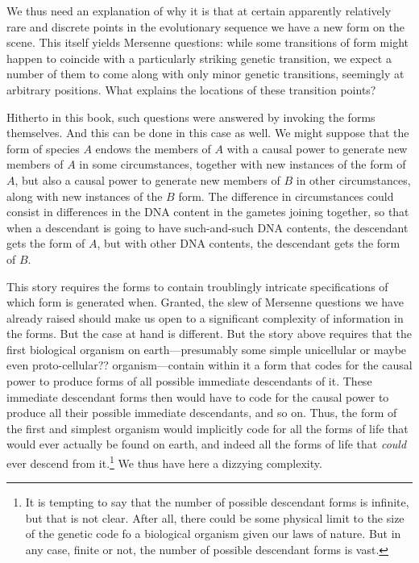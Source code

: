 We thus need an explanation of why it is that at certain apparently relatively rare and discrete points in the evolutionary 
sequence we have a new form on the scene. This itself yields Mersenne questions: while some transitions of form might happen
to coincide with a particularly striking genetic transition, we expect a number of them to come along with only minor
genetic transitions, seemingly at arbitrary positions. What explains the locations of these transition points?

Hitherto in this book, such questions were answered by invoking the forms themselves. And this can be done in this case
as well. We might suppose that the form of species $A$ endows the members of $A$ with a causal power to generate new
members of $A$ in some circumstances, together with new instances of the form of $A$, but also a causal power to generate
new members of $B$ in other circumstances, along with new instances of the $B$ form. The difference in circumstances could consist in differences in the DNA content in the gametes joining together, so that when a descendant is going to have such-and-such DNA 
contents, the descendant gets the form of $A$, but with other DNA contents, the descendant gets the form of $B$. 

This story requires the forms to contain troublingly intricate specifications of which form is generated when. Granted, the slew 
of Mersenne questions we have already raised should make us open to a significant complexity of information
in the forms. But the case at hand is different.
But the story above requires that the first biological organism on earth---presumably
some simple unicellular or maybe even proto-cellular?? organism---contain within it a form that codes for the causal
power to produce forms of all possible immediate descendants of it. These immediate descendant forms then would have 
to code for the causal power to produce all their possible immediate descendants, and so on. Thus, the
form of the first and simplest organism would implicitly code for all the forms of life that would ever actually be
found on earth, and indeed all the forms of life that \textit{could} ever descend from it.\footnote{It is tempting to
say that the number of possible descendant forms is infinite, but that is not clear. After all, there could be some
physical limit to the size of the genetic code fo a biological organism given our laws of nature. But in any case,
finite or not, the number of possible descendant forms is vast.} We thus have here a dizzying complexity.

